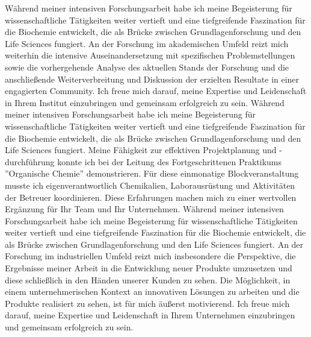     {Während meiner intensiven Forschungsarbeit habe ich meine Begeisterung für wissenschaftliche Tätigkeiten weiter vertieft und eine tiefgreifende Faszination für die Biochemie entwickelt, die als Brücke zwischen Grundlagenforschung und den Life Sciences fungiert. An der Forschung im akademischen Umfeld reizt mich weiterhin die intensive Auseinandersetzung mit spezifischen Problemstellungen sowie die vorhergehende Analyse des aktuellen Stands der Forschung und die anschließende Weiterverbreitung und Diskussion der erzielten Resultate in einer engagierten Community. Ich freue mich darauf, meine Expertise und Leidenschaft in Ihrem Institut einzubringen und gemeinsam erfolgreich zu sein.}{}
    {Während meiner intensiven Forschungsarbeit habe ich meine Begeisterung für wissenschaftliche Tätigkeiten weiter vertieft und eine tiefgreifende Faszination für die Biochemie entwickelt, die als Brücke zwischen Grundlagenforschung und den Life Sciences fungiert. Meine Fähigkeit zur effektiven Projektplanung und -durchführung konnte ich bei der Leitung des Fortgeschrittenen Praktikums ''Organische Chemie'' demonstrieren. Für diese einmonatige Blockveranstaltung musste ich eigenverantwortlich Chemikalien, Laborausrüstung und Aktivitäten der Betreuer koordinieren. Diese Erfahrungen machen mich zu einer wertvollen Ergänzung für Ihr Team und Ihr Unternehmen.}{}
    {Während meiner intensiven Forschungsarbeit habe ich meine Begeisterung für wissenschaftliche Tätigkeiten weiter vertieft und eine tiefgreifende Faszination für die Biochemie entwickelt, die als Brücke zwischen Grundlagenforschung und den Life Sciences fungiert. An der Forschung im industriellen Umfeld reizt mich insbesondere die Perspektive, die Ergebnisse meiner Arbeit in die Entwicklung neuer Produkte umzusetzen und diese schließlich in den Händen unserer Kunden zu sehen. Die Möglichkeit, in einem unternehmerischen Kontext an innovativen Lösungen zu arbeiten und die Produkte realisiert zu sehen, ist für mich äußerst motivierend. Ich freue mich darauf, meine Expertise und Leidenschaft in Ihrem Unternehmen einzubringen und gemeinsam erfolgreich zu sein.}{}
